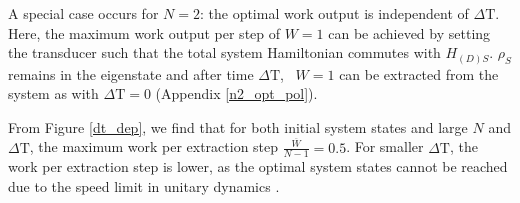 A special case occurs for $N = 2$: the optimal work output is independent of $\Delta \mathrm{T}$.
Here, the maximum work output per step of $W = 1$ can be achieved by setting the transducer such that the total system Hamiltonian commutes with $H_{(D)S}$. $\rho_S$ remains in the eigenstate and after time $\Delta \mathrm{T}$, \ $W = 1$ can be extracted from the system as with $\Delta \mathrm{T} = 0$ (Appendix \ref{n2_opt_pol}).

From Figure \ref{dt_dep}, we find that for both initial system states and large $N$ and $\Delta \mathrm{T}$, the maximum work per extraction step $\frac{\overline{W}}{N-1} = 0.5$.
For smaller $\Delta \mathrm{T}$, the work per extraction step is lower, as the optimal system states cannot be reached due to the speed limit in unitary dynamics \cite{Deffner_2017, PhysRevA.67.052109}.

